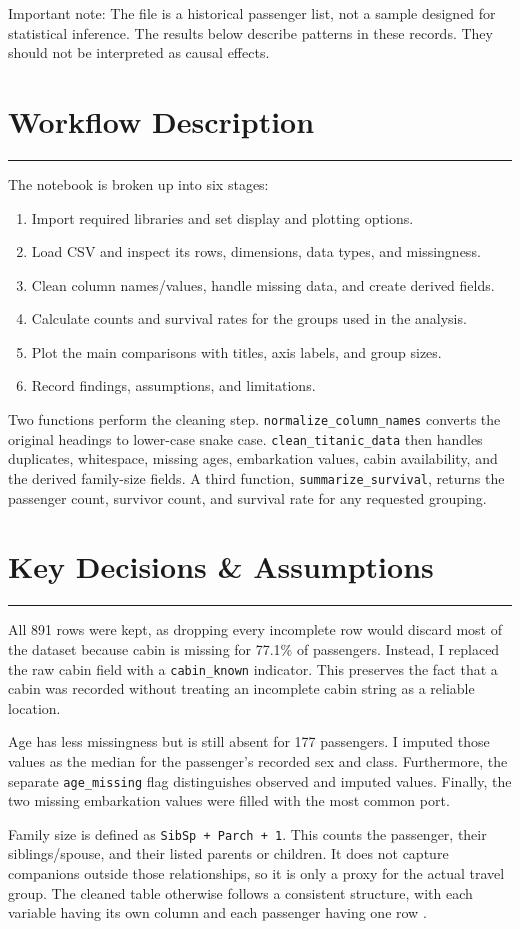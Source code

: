 \documentclass[11pt,a4paper]{article}
\newcommand{\reportsection}[1]{%
  \section{#1}
  \vspace{-0.4em}
  \textcolor{rulegray}{\rule{\textwidth}{0.5pt}}
  \vspace{0.2em}
}
\begin{document}
Important note: The file is a historical passenger list, not a sample designed for
statistical inference. The results below describe patterns in these records. They
should not be interpreted as causal effects.

\reportsection{Workflow Description}

The notebook is broken up into six stages:

\begin{enumerate}
  \item Import required libraries and set display and plotting options.
  \item Load CSV and inspect its rows, dimensions, data types, and missingness.
  \item Clean column names/values, handle missing data, and create derived fields.
  \item Calculate counts and survival rates for the groups used in the analysis.
  \item Plot the main comparisons with titles, axis labels, and group sizes.
  \item Record findings, assumptions, and limitations.
\end{enumerate}

Two functions perform the cleaning step. \texttt{normalize\_column\_names} converts
the original headings to lower-case snake case. \texttt{clean\_titanic\_data}
then handles duplicates, whitespace, missing ages, embarkation values, cabin
availability, and the derived family-size fields. A third function,
\texttt{summarize\_survival}, returns the passenger count, survivor count, and
survival rate for any requested grouping.

\reportsection{Key Decisions \& Assumptions}

All 891 rows were kept, as dropping every incomplete row would discard most of the
dataset because cabin is missing for 77.1\% of passengers. Instead, I replaced
the raw cabin field with a \texttt{cabin\_known} indicator. This preserves the
fact that a cabin was recorded without treating an incomplete cabin string as a
reliable location.

Age has less missingness but is still absent for 177 passengers. I imputed those
values as the median for the passenger's recorded sex and class. Furthermore, the
separate \texttt{age\_missing} flag distinguishes observed and imputed
values. Finally, the two missing embarkation values were filled with the most common
port.

Family size is defined as \texttt{SibSp + Parch + 1}. This counts the passenger,
their siblings/spouse, and their listed parents or children. It does not capture
companions outside those relationships, so it is only a proxy for the actual travel
group. The cleaned table otherwise follows a consistent structure, with each variable
having its own column and each passenger having one row \cite{wickham2014}.
\end{document}

